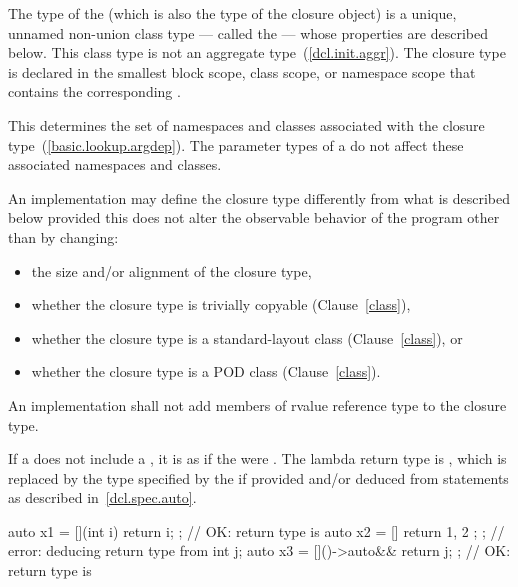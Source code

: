 \pnum
The type of the  (which is also the type of the
closure object) is a unique, unnamed non-union class type
--- called the  ---
whose properties are described below.
This class type is not an aggregate type~(\ref{dcl.init.aggr}).
The closure type is declared in the smallest block
scope, class scope, or namespace scope that contains the corresponding
. \begin{note} This determines the set of namespaces and
classes associated with the closure type~(\ref{basic.lookup.argdep}). The parameter
types of a  do not affect these associated namespaces and
classes. \end{note} An implementation may define the closure type differently from what
is described below provided this does not alter the observable behavior of the program
other than by changing:

\begin{itemize}
\item the size and/or alignment of the closure type,

\item whether the closure type is trivially copyable (Clause~\ref{class}),

\item whether the closure type is a standard-layout class (Clause~\ref{class}),
or

\item whether the closure type is a POD class (Clause~\ref{class}).
\end{itemize}

An implementation shall not add members of rvalue reference type to the closure
type.

\pnum
If a  does not include a
, it is as if the  were
\tcode{()}.
The lambda return type is , which is replaced by the
type specified by the
 if provided and/or deduced from
 statements as described in~\ref{dcl.spec.auto}.
\begin{example}
\begin{codeblock}
auto x1 = [](int i){ return i; };     // OK: return type is 
auto x2 = []{ return { 1, 2 }; };     // error: deducing return type from 
int j;
auto x3 = []()->auto&& { return j; }; // OK: return type is 
\end{codeblock}
\end{example}


